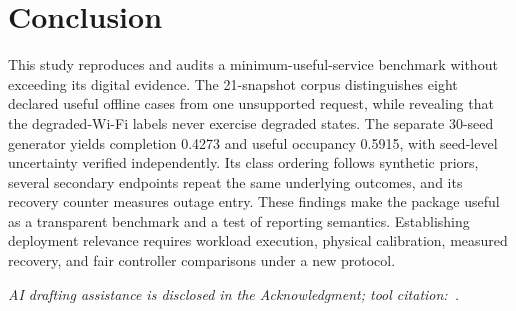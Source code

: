 \section{Conclusion}
This study reproduces and audits a minimum-useful-service benchmark without exceeding its digital evidence. The 21-snapshot corpus distinguishes eight declared useful offline cases from one unsupported request, while revealing that the degraded-Wi-Fi labels never exercise degraded states. The separate 30-seed generator yields completion 0.4273 and useful occupancy 0.5915, with seed-level uncertainty verified independently. Its class ordering follows synthetic priors, several secondary endpoints repeat the same underlying outcomes, and its recovery counter measures outage entry. These findings make the package useful as a transparent benchmark and a test of reporting semantics. Establishing deployment relevance requires workload execution, physical calibration, measured recovery, and fair controller comparisons under a new protocol.

\textit{AI drafting assistance is disclosed in the Acknowledgment; tool citation:~\cite{openai_codex}.}